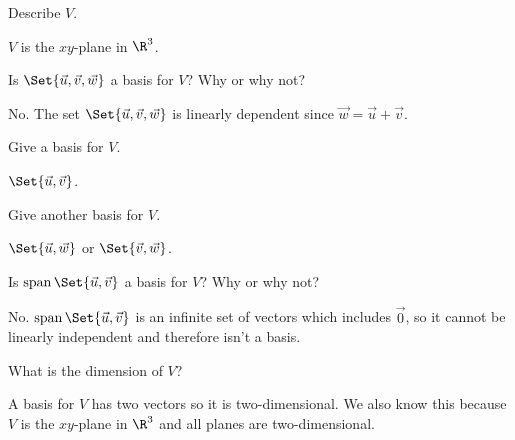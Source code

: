 \documentclass{problemset}
\DeclareMathOperator{\Span}{span}
\begin{document}
	\begin{parts}
		\item Describe $V$.
			\begin{solution}[inline]
				$V$ is the $xy$-plane in $\R^3$.
			\end{solution}
		\item Is $\Set{\vec u,\vec v,\vec w}$ a basis for $V$?  Why or why not?
			\begin{solution}
				No. The set $\Set{\vec u,\vec v,\vec w}$ is linearly dependent since $\vec w=\vec u+\vec v$.
			\end{solution}
		\item Give a basis for $V$.
			\begin{solution}[inline]
				$\Set{\vec u,\vec v}$.
			\end{solution}
		\item Give another basis for $V$.
			\begin{solution}[inline]
				$\Set{\vec u,\vec w}$ or $\Set{\vec v,\vec w}$.
			\end{solution}
		\item Is $\Span\Set{\vec u,\vec v}$ a basis for $V$?  Why or why not?
			\begin{solution}
				No. $\Span\Set{\vec u,\vec v}$ is an infinite set of vectors
				which includes $\vec 0$, so it cannot be linearly independent and
				therefore isn't a basis.
			\end{solution}
		\item What is the dimension of $V$?
			\begin{solution}
				A basis for $V$ has two vectors so it is two-dimensional. We also
				know this because $V$ is the $xy$-plane in $\R^3$ and all planes
				are two-dimensional.
			\end{solution}
	\end{parts}
\end{document}
